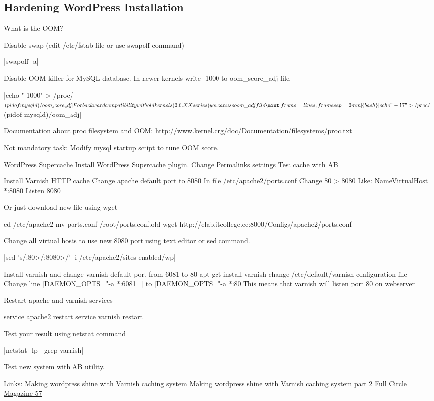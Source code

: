 \subsection{Hardening WordPress Installation}

What is the OOM?

Disable swap (edit /etc/fstab file or use swapoff command)


|swapoff -a|

Disable OOM killer for MySQL database. In newer kernels write -1000 to oom\_score\_adj file.

|echo "-1000" > /proc/$(pidof mysqld)/oom_score_adj|
For backward compatibility with old kernels (2.6.XX series) you can use oom\_adj file
\mint[frame=lines, framesep=2mm]{bash}|echo "-17" > /proc/$(pidof mysqld)/oom_adj|

Documentation about proc filesystem and OOM:
\url{http://www.kernel.org/doc/Documentation/filesystems/proc.txt}

Not mandatory task: Modify mysql startup script to tune OOM score. 

WordPress Supercache
Install WordPress Supercache plugin.
Change Permalinks settings
Test cache with AB

Install Varnish HTTP cache
Change apache default port to 8080
In file /etc/apache2/ports.conf
Change 80 > 8080
Like:
NameVirtualHost *:8080
Listen 8080

Or just download new file using wget 

cd /etc/apache2
mv ports.conf /root/ports.conf.old
wget http://elab.itcollege.ee:8000/Configs/apache2/ports.conf

Change all virtual hosts to use new 8080 port using text editor or sed command.

|sed 's/:80>/:8080>/' -i /etc/apache2/sites-enabled/wp|


Install varnish and change varnish default port from 6081 to 80
apt-get install varnish
change /etc/default/varnish configuration file
Change line
|DAEMON_OPTS="-a *:6081 \ |
to
|DAEMON_OPTS="-a *:80 \|

This means that varnish will listen port 80 on webserver

Restart apache and varnish services

service apache2 restart
service varnish restart

Test your result using netstat command

|netstat -lp | grep varnish|

Test new system with AB utility.

Links:
\href{http://kaanon.com/blog/work/making-wordpress-shine-varnish-caching-system-part-1}{Making wordpress shine with Varnish caching system}
\href{http://kaanon.com/blog/varnish/making-wordpress-shine-varnish-caching-system-part-2}{Making wordpress shine with Varnish caching system part 2}
\href{http://www.google.com/producer/editions/CAowvZtX/full_circle_magazine_57_lite}
{Full Circle Magazine 57}

